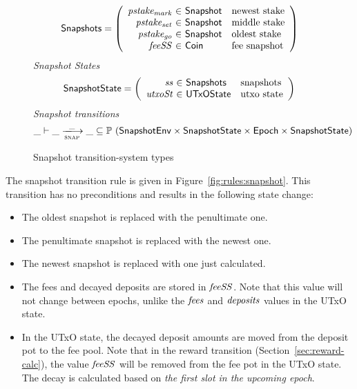 \begin{figure}[htb]
  \begin{equation*}
    \Snapshots =
    \left(
      \begin{array}{r@{~\in~}ll}
        \var{pstake_{mark}} & \Snapshot & \text{newest stake}\\
        \var{pstake_{set}}  & \Snapshot & \text{middle stake}\\
        \var{pstake_{go}}   & \Snapshot & \text{oldest stake}\\
        \var{feeSS} & \Coin & \text{fee snapshot}\\
      \end{array}
    \right)
  \end{equation*}
  \emph{Snapshot States}
  \begin{equation*}
    \SnapshotState =
    \left(
      \begin{array}{r@{~\in~}ll}
        \var{ss} & \Snapshots & \text{snapshots}\\
        \var{utxoSt} & \UTxOState & \text{utxo state}\\
      \end{array}
    \right)
  \end{equation*}
  \emph{Snapshot transitions}
  \begin{equation*}
    \_ \vdash
    \var{\_} \trans{snap}{\_} \var{\_}
    \subseteq \powerset (\SnapshotEnv \times \SnapshotState \times \Epoch \times \SnapshotState)
  \end{equation*}
  \caption{Snapshot transition-system types}
  \label{fig:ts-types:snapshot}
\end{figure}

The snapshot transition rule is given in Figure~\ref{fig:rules:snapshot}.
This transition has no preconditions and results in the following state change:

\begin{itemize}
  \item The oldest snapshot is replaced with the penultimate one.
  \item The penultimate snapshot is replaced with the newest one.
  \item The newest snapshot is replaced with one just calculated.
  \item The fees and decayed deposits are stored in $\mathit{feeSS}$. Note that this value will not
    change between epochs, unlike the $\mathit{fees}$ and $\mathit{deposits}$ values in the UTxO state.
  \item In the UTxO state, the decayed deposit amounts are moved from the deposit pot
    to the fee pool. Note that in the reward transition (Section~\ref{sec:reward-calc}),
    the value $\mathit{feeSS}$ will be removed from the fee pot in the UTxO state.
    The decay is calculated based on \textit{the first slot in the upcoming epoch}.
\end{itemize}

